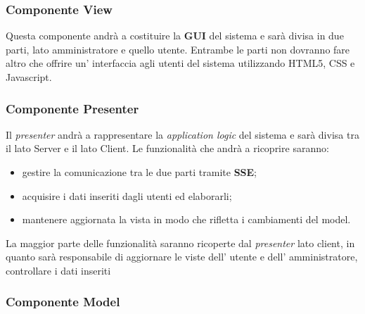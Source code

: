\subsubsection{Componente View}
Questa componente andrà a costituire la \textbf{GUI} del sistema e sarà divisa in due parti, lato amministratore e quello utente. Entrambe le parti non dovranno fare altro che offrire un' interfaccia agli utenti del sistema utilizzando HTML5, CSS e Javascript.
\subsubsection{Componente Presenter}
Il \textit{presenter} andrà a rappresentare la \textit{application logic} del sistema e sarà divisa tra il lato Server e il lato Client. Le funzionalità che andrà a ricoprire saranno:
\begin{itemize}
	\item gestire la comunicazione tra le due parti tramite \textbf{SSE};
	\item acquisire i dati inseriti dagli utenti ed elaborarli;
	\item mantenere aggiornata la vista in modo che rifletta i cambiamenti del model.
\end{itemize}
La maggior parte delle funzionalità saranno ricoperte dal \textit{presenter} lato client, in quanto sarà responsabile di aggiornare le viste dell' utente e dell' amministratore, controllare i dati inseriti 
\subsubsection{Componente Model}